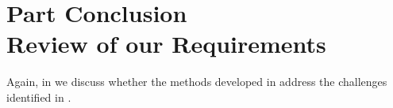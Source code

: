 \begin{subappendices}
%	
%	
%	
	
\end{subappendices}


\chapter*{Part Conclusion\\ {\LARGE Review of our Requirements}}


Again, in  we discuss whether the methods developed in  address the challenges identified in .

